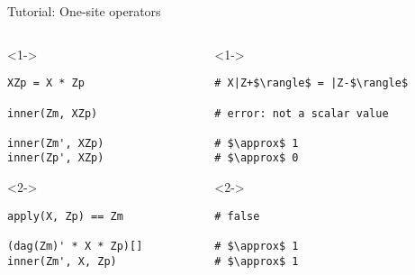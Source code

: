 \begin{frame}[fragile]{Tutorial: One-site operators}


\begin{columns}

\begin{column}{4.5cm}

\begin{onlyenv}<1->

\begin{lstlisting}[language=JuliaLocal, style=julia, basicstyle=\small]
XZp = X * Zp

inner(Zm, XZp)

inner(Zm', XZp)
inner(Zp', XZp)
\end{lstlisting}

\end{onlyenv}

\begin{onlyenv}<2->

\begin{lstlisting}[language=JuliaLocal, style=julia, basicstyle=\small]
apply(X, Zp) == Zm

(dag(Zm)' * X * Zp)[]
inner(Zm', X, Zp)
\end{lstlisting}

\end{onlyenv}

\end{column}

\begin{column}{4.5cm}

\begin{onlyenv}<1->

\begin{lstlisting}[style=julia, numbers=none, mathescape, basicstyle=\small]
# X|Z+$\rangle$ = |Z-$\rangle$

# error: not a scalar value

# $\approx$ 1
# $\approx$ 0
\end{lstlisting}

\end{onlyenv}

\begin{onlyenv}<2->

\begin{lstlisting}[style=julia, numbers=none, mathescape, basicstyle=\small]
# false

# $\approx$ 1
# $\approx$ 1
\end{lstlisting}

\end{onlyenv}

\end{column}

\end{columns}

\end{frame}
